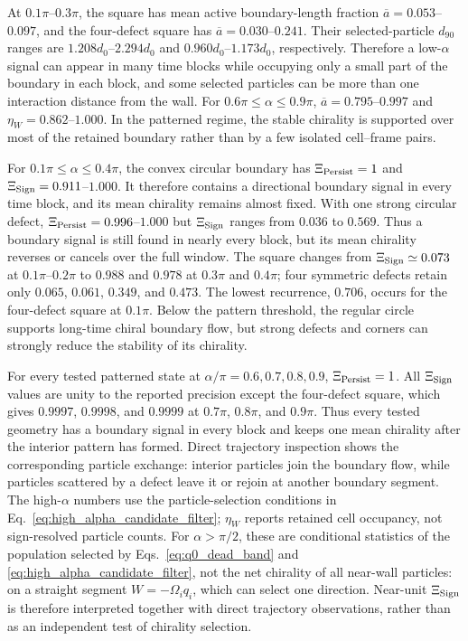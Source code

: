 \documentclass[11pt]{article}
\numberwithin{equation}{section}
\begin{document}
At $0.1\pi$--$0.3\pi$, the square has mean active boundary-length fraction
$\overline a=0.053$--$0.097$, and the four-defect square has
$\overline a=0.030$--$0.241$.  Their selected-particle $d_{90}$ ranges are
$1.208d_0$--$2.294d_0$ and $0.960d_0$--$1.173d_0$, respectively.  Therefore a
low-$\alpha$ signal can appear in many time blocks while occupying only a small
part of the boundary in each block, and some selected particles can be more
than one interaction distance from the wall.  For
$0.6\pi\le\alpha\le0.9\pi$, $\overline a=0.795$--$0.997$ and
$\eta_W=0.862$--$1.000$.  In the patterned regime, the stable chirality is
supported over most of the retained boundary rather than by a few isolated
cell--frame pairs.

For $0.1\pi\le\alpha\le0.4\pi$, the convex circular boundary has
$\Xi_{\rm Persist}=1$ and $\Xi_{\rm Sign}=0.911$--$1.000$.  It therefore
contains a directional boundary signal in every time block, and its mean
chirality remains almost fixed.  With one strong circular defect,
$\Xi_{\rm Persist}=0.996$--$1.000$ but $\Xi_{\rm Sign}$ ranges from $0.036$
to $0.569$.  Thus a boundary signal is still found in nearly every block, but
its mean chirality reverses or cancels over the full window.  The square changes from
$\Xi_{\rm Sign}\simeq0.073$ at $0.1\pi$--$0.2\pi$ to $0.988$ and $0.978$ at
$0.3\pi$ and $0.4\pi$; four symmetric defects retain only $0.065$, $0.061$,
$0.349$, and $0.473$.  The lowest recurrence, $0.706$, occurs for the
four-defect square at $0.1\pi$.  Below the pattern threshold, the regular
circle supports long-time chiral boundary flow, but strong defects and corners
can strongly reduce the stability of its chirality.

For every tested patterned state at
$\alpha/\pi=0.6,0.7,0.8,0.9$, $\Xi_{\rm Persist}=1$.  All
$\Xi_{\rm Sign}$ values are unity to the reported precision except the four-defect square,
which gives $0.9997$, $0.9998$, and $0.9999$ at $0.7\pi$, $0.8\pi$, and
$0.9\pi$.  Thus every tested geometry has a boundary signal in every block and
keeps one mean chirality after the interior pattern has formed.  Direct
trajectory inspection shows the corresponding particle exchange: interior
particles join the boundary flow, while particles scattered by a defect leave
it or rejoin at another boundary segment.  The high-$\alpha$ numbers use the
particle-selection conditions in Eq.~\eqref{eq:high_alpha_candidate_filter};
$\eta_W$ reports retained cell occupancy, not sign-resolved particle counts.
For $\alpha>\pi/2$, these are conditional statistics of the population
selected by Eqs.~\eqref{eq:q0_dead_band} and
\eqref{eq:high_alpha_candidate_filter}, not the net chirality
of all near-wall particles: on a straight segment $W=-\Omega_iq_i$, which
can select one direction. Near-unit $\Xi_{\rm Sign}$ is therefore interpreted
together with direct trajectory observations, rather than as an independent
test of chirality selection.
\end{document}
